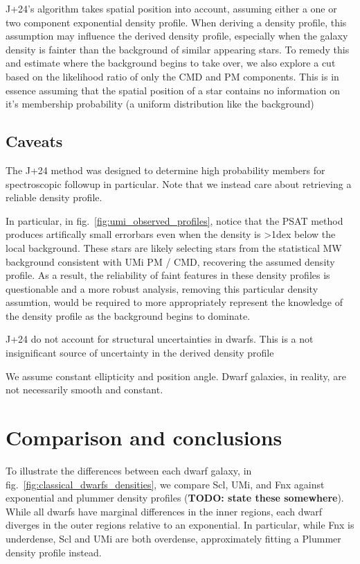 J+24's algorithm takes spatial position into account, assuming either a
one or two component exponential density profile. When deriving a
density profile, this assumption may influence the derived density
profile, especially when the galaxy density is fainter than the
background of similar appearing stars. To remedy this and estimate where
the background begins to take over, we also explore a cut based on the
likelihood ratio of only the CMD and PM components. This is in essence
assuming that the spatial position of a star contains no information on
it's membership probability (a uniform distribution like the background)

\subsection{Caveats}\label{caveats}

The J+24 method was designed to determine high probability members for
spectroscopic followup in particular. Note that we instead care about
retrieving a reliable density profile.

In particular, in fig.~\ref{fig:umi_observed_profiles}, notice that the
PSAT method produces artifically small errorbars even when the density
is \textgreater1dex below the local background. These stars are likely
selecting stars from the statistical MW background consistent with UMi
PM / CMD, recovering the assumed density profile. As a result, the
reliability of faint features in these density profiles is questionable
and a more robust analysis, removing this particular density assumtion,
would be required to more appropriately represent the knowledge of the
density profile as the background begins to dominate.

J+24 do not account for structural uncertainties in dwarfs. This is a
not insignificant source of uncertainty in the derived density profile

We assume constant ellipticity and position angle. Dwarf galaxies, in
reality, are not necessarily smooth and constant.

\section{Comparison and conclusions}\label{comparison-and-conclusions}

To illustrate the differences between each dwarf galaxy, in
fig.~\ref{fig:classical_dwarfs_densities}, we compare Scl, UMi, and Fnx
against exponential and plummer density profiles (\textbf{TODO: state
these somewhere}). While all dwarfs have marginal differences in the
inner regions, each dwarf diverges in the outer regions relative to an
exponential. In particular, while Fnx is underdense, Scl and UMi are
both overdense, approximately fitting a Plummer density profile instead.

